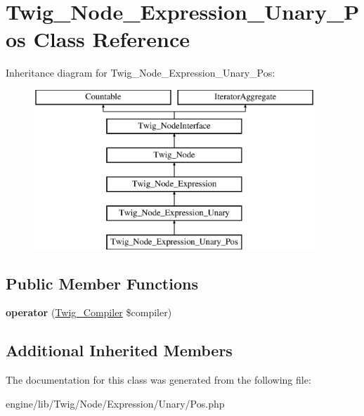 \hypertarget{class_twig___node___expression___unary___pos}{}\section{Twig\+\_\+\+Node\+\_\+\+Expression\+\_\+\+Unary\+\_\+\+Pos Class Reference}
\label{class_twig___node___expression___unary___pos}
Inheritance diagram for Twig\+\_\+\+Node\+\_\+\+Expression\+\_\+\+Unary\+\_\+\+Pos\+:\begin{figure}[H]
\begin{center}
\leavevmode
\includegraphics[height=6.000000cm]{class_twig___node___expression___unary___pos}
\end{center}
\end{figure}
\subsection*{Public Member Functions}
\begin{DoxyCompactItemize}
\item 
\hypertarget{class_twig___node___expression___unary___pos_af77318ec88d5f8a508684970a150b670}{}{\bfseries operator} (\hyperlink{class_twig___compiler}{Twig\+\_\+\+Compiler} \$compiler)\label{class_twig___node___expression___unary___pos_af77318ec88d5f8a508684970a150b670}

\end{DoxyCompactItemize}
\subsection*{Additional Inherited Members}


The documentation for this class was generated from the following file\+:\begin{DoxyCompactItemize}
\item 
engine/lib/\+Twig/\+Node/\+Expression/\+Unary/Pos.\+php\end{DoxyCompactItemize}
